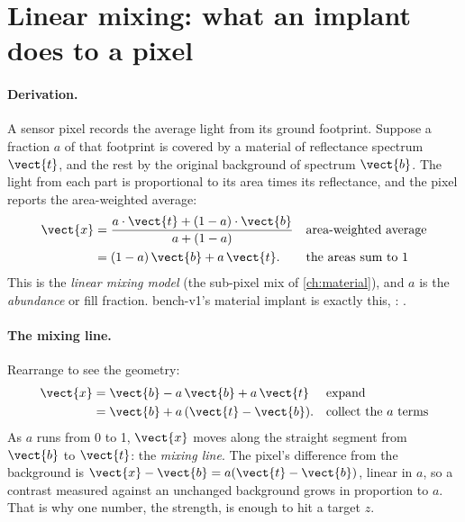\section{Linear mixing: what an implant does to a pixel}\label{sec:benchmarks:mixing}

\paragraph{Derivation.} A sensor pixel records the average light from its ground footprint. Suppose a fraction $a$
of that footprint is covered by a material of reflectance spectrum $\vect{t}$, and the rest by the original background
of spectrum $\vect{b}$. The light from each part is proportional to its area times its reflectance, and the pixel
reports the area-weighted average:
\begin{align*}
\vect{x} &= \frac{a \cdot \vect{t} + (1 - a) \cdot \vect{b}}{a + (1 - a)} && \text{area-weighted average}\\
&= (1 - a)\,\vect{b} + a\,\vect{t}. && \text{the areas sum to 1}
\end{align*}
This is the \emph{linear mixing model} (the sub-pixel mix of \cref{ch:material}), and $a$ is the
\emph{abundance} or fill fraction. bench-v1's material implant is exactly this,
: .

\paragraph{The mixing line.} Rearrange to see the geometry:
\begin{align*}
\vect{x} &= \vect{b} - a\,\vect{b} + a\,\vect{t} && \text{expand}\\
&= \vect{b} + a\,(\vect{t} - \vect{b}). && \text{collect the $a$ terms}
\end{align*}
As $a$ runs from 0 to 1, $\vect{x}$ moves along the straight segment from $\vect{b}$ to $\vect{t}$: the
\emph{mixing line}. The pixel's difference from the background is $\vect{x} - \vect{b} =
a(\vect{t} - \vect{b})$, linear in $a$, so a contrast measured against an unchanged background grows in proportion to
$a$. That is why one number, the strength, is enough to hit a target $z$.

